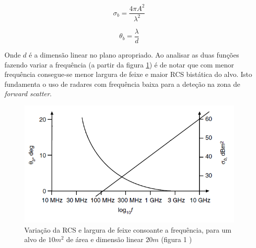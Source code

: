 \begin{equation} \label{2.9}
\sigma_{b}=\dfrac{4\pi A^{2}}{\lambda^{2}}
\end{equation}

\begin{equation} \label{2.10}
\theta_{b}=\dfrac{\lambda}{d}
\end{equation}

Onde $d$ é a dimensão linear no plano apropriado.
Ao analisar as duas funções fazendo variar a frequência (a partir da figura \ref{fig:rcs_ang}) é de notar que com menor frequência consegue-se menor largura de feixe e maior \gls{RCS} bistática do alvo. Isto fundamenta o uso de radares com frequência baixa para a deteção na zona de \textit{forward scatter}.

\begin{figure}[h]
\centering
\includegraphics[scale=0.7]{chapters/ch2/assets/rcs_ang}
\caption[Variação da \gls{RCS} e largura de feixe consoante a frequência]{Variação da \gls{RCS} e largura de feixe consoante a frequência, para um alvo de $10m^{2}$ de área e dimensão linear $20m$ (figura 1 \cite{Griffiths2005})}
\label{fig:rcs_ang}
\end{figure}

